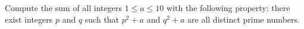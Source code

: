 Compute the sum of all integers $1 \le a \le 10$ with the following property: there exist integers $p$ and $q$ such that   $p^2+a$ and $q^2+a$ are all distinct prime numbers.